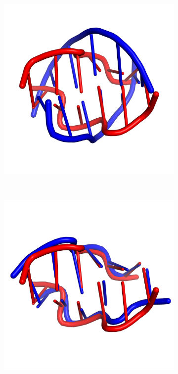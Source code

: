 \begin{figure}[!p]
  \begin{subfigure}{.5\linewidth}
    \includegraphics[width=\linewidth]{figures/discusion/rsroff/3ew9_best.png}
    \caption{}
  \end{subfigure}%
~
   \begin{subfigure}{.5\linewidth}
    \includegraphics[width=\linewidth]{figures/discusion/rsroff/3ew9_rmsd.png}
    \caption{}
  \end{subfigure}


\end{figure}
